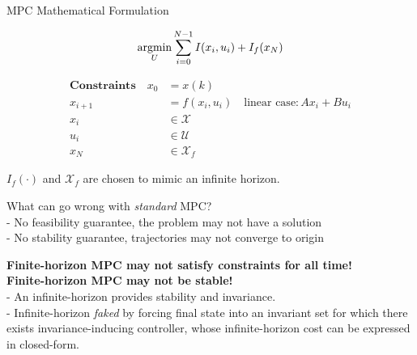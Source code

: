 
\begin{sstTitleBox}{
    MPC Mathematical Formulation
  }
  \begin{sstOnlyFrame}
    \begin{equation}
      \underset U{\operatorname{argmin}}
      \sum_{i=0}^{N-1} I(x_i,u_i) + I_f(x_N)
      \label{mpc:nominal}
    \end{equation}

    \vspace{-3mm}
    \begin{minipage}[t]{0.67\linewidth}
      \begin{align*}
        \textbf{Constraints}
        \quad
        x_0     & = x(k)            \\
        x_{i+1} & = f(x_i,u_i) \quad \text{linear case}: Ax_i + Bu_i      \\
        x_{i}   & \in \mathcal{X}   \\
        u_i     & \in \mathcal{U}   \\
        x_N     & \in \mathcal{X}_f
      \end{align*}
    \end{minipage}

    $I_f(\cdot)$ and $\mathcal{X}_f$
    are chosen to mimic an infinite horizon.
  \end{sstOnlyFrame}
\end{sstTitleBox}

What can go wrong with \textit{standard} MPC?
\\
- No feasibility guarantee, the problem may not have a solution
\\
- No stability guarantee, trajectories may not converge to  origin

\textbf{Finite-horizon MPC may not satisfy constraints for all time!}
\\
\textbf{Finite-horizon MPC may not be stable!}
\\
-  An infinite-horizon provides stability and invariance.
\\
-  Infinite-horizon \textit{faked} by forcing final state
into an invariant set for which there exists
invariance-inducing controller,
whose infinite-horizon cost can be expressed in closed-form.

